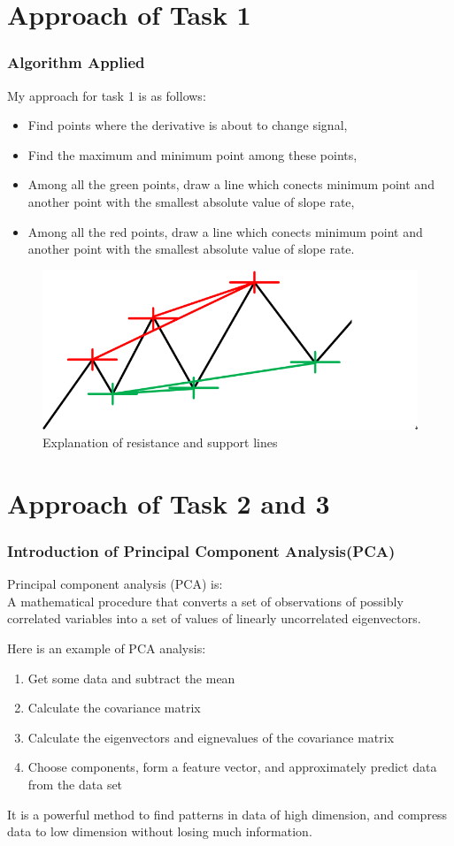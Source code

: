 \documentclass[compress,handout,10pt]{beamer}
\let\olditem\item
\renewcommand{\item}{\setlength{\itemsep}{0.5\baselineskip}\olditem}
\begin{document}
\section{Approach of Task 1}
\begin{frame}
\frametitle{Algorithm Applied}
My approach for task 1 is as follows:
\begin{itemize}
\item Find points where the  derivative is about to change signal,
\item Find the maximum and minimum point among these points,
\item Among all the green points, draw a line which conects minimum point and another point with the smallest absolute value of slope rate,
\item Among all the red points, draw a line which conects minimum point and another point with the smallest absolute value of slope rate.
\end{itemize}
\begin{figure}[h]
    \begin{center}
        \includegraphics[width=\textwidth]{images/5.png}
    \end{center}
    \caption{Explanation of resistance and support lines}
    \label{fig:ers}
\end{figure}
\end{frame}

\section{Approach of Task 2 and 3}
\begin{frame}
    \frametitle{Introduction of Principal Component Analysis(PCA)}
Principal component analysis (PCA) is:\\
A mathematical procedure that converts a set of observations of possibly correlated variables into a set of values of linearly uncorrelated eigenvectors. 

Here is an example of PCA analysis:
	\begin{enumerate}
	\item Get some data and subtract the mean
	\item Calculate the covariance matrix 
	\item Calculate the eigenvectors and eignevalues of the covariance matrix
	\item Choose components, form a feature vector, and approximately predict data from the data set
	\end{enumerate}
It is a powerful method to find patterns in data of high dimension, and compress data to low dimension without losing much information.
\end{frame}
\end{document}
